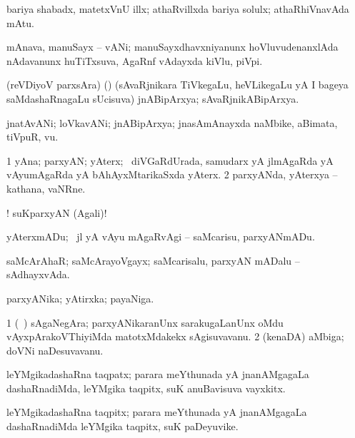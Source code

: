 {{{{{{{{{{{{{{\bentry 
{} 
\gl{\nA}
\expl{\Latin }
\bmng
bariya shabadx, matetxVnU illx; athaRvillxda bariya solulx; athaRhiVnavAda mAtu. 
\emng
\eentry

\bentry 
{} 
\gl{\nA}
\expl{\Latin}
\bmng
mAnava, manuSayx -- vANi; manuSayxdhavxniyanunx hoVluvudenanxlAda nAdavanunx huTiTxsuva, AgaRnf vAdayxda kiVlu, piVpi. 
\emng
\eentry

\bentry 
{} 
\gl{\nA}
\expl{}
\bmng
 (reVDiyoV parxsAra) (\AmA) (sAvaRjnikara TiVkegaLu, heVLikegaLu yA I bageya saMdashaRnagaLu sUcisuva) jnABipArxya; sAvaRjnikABipArxya. 
\emng
\eentry

\bentry 
{} 
\gl{\nA}
\expl{\Latin}
\bmng
jnatAvANi; loVkavANi; jnABipArxya; jnasAmAnayxda naMbike, aBimata, tiVpuR, \mo vu. 
\emng
\eentry

\bentry
{} 
\gl{\nA}
\expl{}
\bmng
\bnum
\num{1} yAna; parxyAN; yAterx; \kanmu\ diVGaRdUrada, samudarx yA jlmAgaRda yA vAyumAgaRda yA bAhAyxMtarikaSxda yAterx. 
\num{2} parxyANda, yAterxya -- kathana, vaNRne. 
\enum
\emng

\noindent 
\gl{\pagu}
\expl{}
\bmng
{} ! suKparxyAN (Agali)! 
\emng
\eentry

\bentry
{} 
\gl{\sakirx}
\expl{}
\bmng
 yAterxmADu; \kanmu\ jl yA vAyu mAgaRvAgi -- saMcarisu, parxyANmADu. 
\emng
\eentry

\bentry 
{} 
\gl{\gu}
\expl{}
\bmng
 saMcArAhaR; saMcArayoVgayx; saMcarisalu, parxyAN mADalu -- sAdhayxvAda. 
\emng
\eentry

\bentry 
{} 
\gl{\nA}
\expl{}
\bmng
 parxyANika; yAtirxka; payaNiga. 
\emng
\eentry

\bentry 
{} 
\gl{\nA}
\expl{}
\bmng
\bnum
\num{1} (\kanmu\ \ca) sAgaNegAra; parxyANikaranUnx sarakugaLanUnx oMdu vAyxpArakoVThiyiMda matotxMdakekx sAgisuvavanu. 
\num{2} (kenaDA) aMbiga; doVNi naDesuvavanu. 
\enum
\emng
\eentry

\bentry
{} 
\gl{\nA}
\expl{}
\bmng
 leYMgikadashaRna taqpatx; parara meYthunada yA jnanAMgagaLa dashaRnadiMda, leYMgika taqpitx, suK anuBavisuva vayxkitx. 
\emng
\eentry

\bentry 
{} 
\gl{\nA}
\expl{}
\bmng
 leYMgikadashaRna taqpitx; parara meYthunada yA jnanAMgagaLa dashaRnadiMda leYMgika taqpitx, suK paDeyuvike. 
\emng
\eentry

}}}}}}}}}}}}}}
